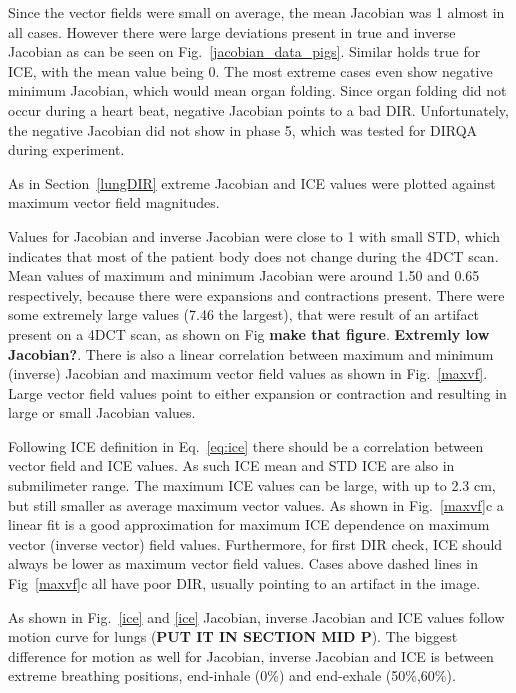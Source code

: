 \documentclass[type=dr, dr=rernat, accentcolor=tud7b,colorbacktitle, bigchapter, openright, twoside, 12pt ]{tudthesis}
\begin{document}
Since the vector fields were small on average, the mean Jacobian was 1 almost in all cases. However there were large deviations present in true and inverse Jacobian as can be seen on Fig.~\ref{jacobian_data_pigs}. Similar holds true for ICE, with the mean value being 0. The most extreme cases even show negative minimum Jacobian, which would mean organ folding. Since organ folding did not occur during a heart beat, negative Jacobian points to a bad DIR. Unfortunately, the negative Jacobian did not show in phase 5, which was tested for DIRQA during experiment.

As in Section~\ref{lungDIR} extreme Jacobian and ICE values were plotted against maximum vector field magnitudes. 



Values for Jacobian and inverse Jacobian were close to 1 with small STD, which indicates that most of the patient body does not change during the 4DCT scan. Mean values of maximum and minimum Jacobian were around 1.50 and 0.65 respectively, because there were expansions and contractions present. There were some extremely large values (7.46 the largest), that were result of an artifact present on a 4DCT scan, as shown on Fig \textbf{make that figure}. \textbf{Extremly low Jacobian?}. There is also a linear correlation between maximum and minimum (inverse) Jacobian and maximum vector field values as shown in Fig.~\ref{maxvf}. Large vector field values point to either expansion or contraction and resulting in large or small Jacobian values.

Following ICE definition in Eq.~\ref{eq:ice} there should be a correlation between vector field and ICE values. As such ICE mean and STD ICE are also in submilimeter range. The maximum ICE values can be large, with up to 2.3 cm, but still smaller as average maximum vector values. As shown in Fig.~\ref{maxvf}c a linear fit is a good approximation for maximum ICE dependence on maximum vector (inverse vector) field values. Furthermore, for first DIR check, ICE should always be lower as maximum vector field values. Cases above dashed lines in Fig~\ref{maxvf}c all have poor DIR, usually pointing to an artifact in the image.

As shown in Fig.~\ref{ice} and \ref{ice} Jacobian, inverse Jacobian and ICE values follow motion curve for lungs (\textbf{PUT IT IN SECTION MID P}). The biggest difference for motion as well for Jacobian, inverse Jacobian and ICE is between extreme breathing positions, end-inhale (0\%) and end-exhale (50\%,60\%). 
\end{document}
